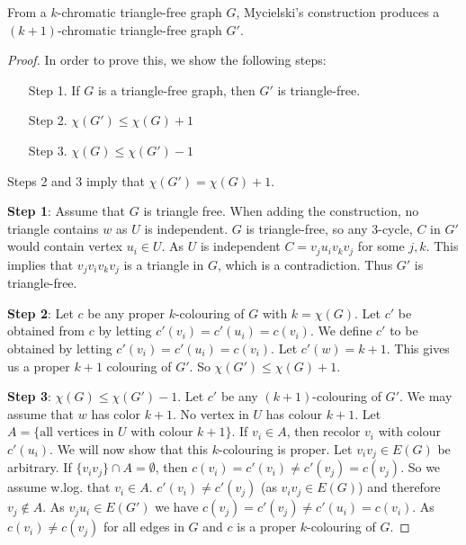 
\begin{theorem}[Mycielski, 1955]
	From a $k$-chromatic triangle-free graph $G$, Mycielski's construction produces a $(k+1)$-chromatic triangle-free graph $G'$.
\end{theorem}

\begin{proof}
	In order to prove this, we show the following steps:

	\begin{enumerate}
		\item[Step 1. ] If $G$ is a triangle-free graph, then $G'$ is triangle-free.
		\item[Step 2. ] $\chi(G') \le \chi(G)+1$
		\item[Step 3. ] $\chi(G) \le \chi(G')-1$
	\end{enumerate}
	Steps 2 and 3 imply that $\chi(G') = \chi(G)+1$.

	\textbf{Step 1}: Assume that $G$ is triangle free. When adding the construction, no triangle contains $w$ as $U$ is independent. $G$ is triangle-free, so any 3-cycle, $C$ in $G'$ would contain vertex $u_{i} \in U$. As $U$ is independent $C = v_{j}u_{i}v_{k}v_{j}$ for some $j,k$. This implies that $v_{j}v_{i}v_{k}v_{j}$ is a triangle in $G$, which is a contradiction. Thus $G'$ is triangle-free.

	\textbf{Step 2}: Let $c$ be any proper $k$-colouring of $G$ with $k = \chi(G)$. Let $c'$ be obtained from $c$ by letting $c'(v_{i}) = c'(u_{i})=c(v_{i})$. We define $c'$ to be obtained by letting $c'(v_{i}) = c'(u_{i}) = c(v_{i})$. Let $c'(w) = k+1$. This gives us a proper $k+1$ colouring of $G'$. So $\chi(G') \le \chi(G) +1$.

	\textbf{Step 3}: $\chi(G) \le \chi(G')-1$. Let $c'$ be any $(k+1)$-colouring of $G'$. We may assume that $w$ has color $k+1$. No vertex in $U$ has colour $k+1$. Let $A = \{\text{all vertices in } U \text{ with colour }k+1\}$. If $v_{i} \in A$, then recolor $v_{i}$ with colour $c'(u_{i})$. We will now show that this $k$-colouring is proper. Let $v_{i}v_{j} \in E(G)$ be arbitrary. If $\{v_{i}v_{j}\} \cap A = \emptyset$, then $c(v_{i}) = c'(v_{i}) \ne c'(v_{j}) = c(v_{j})$. So we assume w.log. that $v_{i} \in A$. $c'(v_{i}) \ne c'(v_{j})$ (as $v_{i}v_{j} \in E(G)$) and therefore $v_{j} \notin A$. As $v_{j}u_{i} \in E(G')$ we have $c(v_{j}) = c'(v_{j}) \ne c'(u_{i}) = c(v_{i})$. As $c(v_{i}) \ne c(v_{j})$ for all edges in $G$ and $c$ is a proper $k$-colouring of $G$.
\end{proof}

